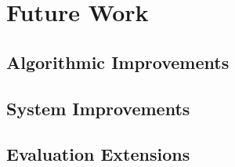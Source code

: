 \chapter{Future Work}

\section{Algorithmic Improvements}

\section{System Improvements}

\section{Evaluation Extensions}
